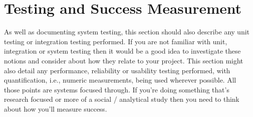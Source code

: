 
\chapter{Testing and Success Measurement}

As well as documenting system testing, this section should also
describe any unit testing or integration testing performed. If you are not familiar with unit, integration or
system testing then it would be a good idea to investigate these notions and consider about how they
relate to your project. This section might also detail any performance, reliability or usability testing
performed, with quantification, i.e., numeric measurements, being used wherever possible. All those points
are systems focused through. If you’re doing something that’s research focused or more of a social /
analytical study then you need to think about how you’ll measure success.
